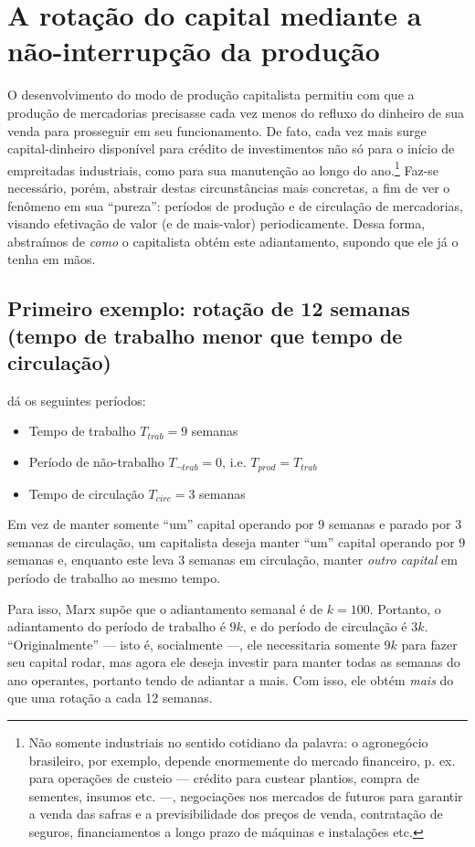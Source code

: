 \documentclass[12pt]{article}
\numberwithin{equation}{section}
\theoremstyle{plain}
\theoremstyle{definition}
\theoremstyle{remark}
\begin{document}
\section{A rotação do capital mediante a não-interrupção da produção}
O desenvolvimento do modo de produção capitalista permitiu com que a produção de mercadorias precisasse cada vez menos do refluxo do dinheiro de sua venda para prosseguir em seu funcionamento. De fato, cada vez mais surge capital-dinheiro disponível para crédito de investimentos não só para o início de empreitadas industriais, como para sua manutenção ao longo do ano.\footnote{Não somente industriais no sentido cotidiano da palavra: o agronegócio brasileiro, por exemplo, depende enormemente do mercado financeiro, p. ex. para operações de custeio — crédito para custear plantios, compra de sementes, insumos etc. —, negociações nos mercados de futuros para garantir a venda das safras e a previsibilidade dos preços de venda, contratação de seguros, financiamentos a longo prazo de máquinas e instalações etc.} Faz-se necessário, porém, abstrair destas circunstâncias mais concretas, a fim de ver o fenômeno em sua ``pureza'': períodos de produção e de circulação de mercadorias, visando efetivação de valor (e de mais-valor) periodicamente. Dessa forma, abstraímos de \textit{como} o capitalista obtém este adiantamento, supondo que ele já o tenha em mãos.

\subsection{Primeiro exemplo: rotação de 12 semanas (tempo de trabalho menor que tempo de circulação)}
\textcite[p. 356-7]{Marx2014} dá os seguintes períodos:
\begin{itemize}
\item Tempo de trabalho $T_{trab} = 9$ semanas
\item Período de não-trabalho $T_{\lnot trab}=0$, i.e. $T_{prod}=T_{trab}$
\item Tempo de circulação $T_{circ}=3$ semanas
\end{itemize}

Em vez de manter somente ``um'' capital operando por $9$ semanas e parado por $3$ semanas de circulação, um capitalista deseja manter ``um'' capital operando por $9$ semanas e, enquanto este leva $3$ semanas em circulação, manter \textit{outro capital} em período de trabalho ao mesmo tempo.

Para isso, Marx supõe que o adiantamento semanal é de $k=100$. Portanto, o adiantamento do período de trabalho é $9k$, e do período de circulação é $3k$. ``Originalmente'' — isto é, socialmente —, ele necessitaria somente $9k$ para fazer seu capital rodar, mas agora ele deseja investir para manter todas as semanas do ano operantes, portanto tendo de adiantar a mais. Com isso, ele obtém \textit{mais} do que uma rotação a cada 12 semanas.
\end{document}
